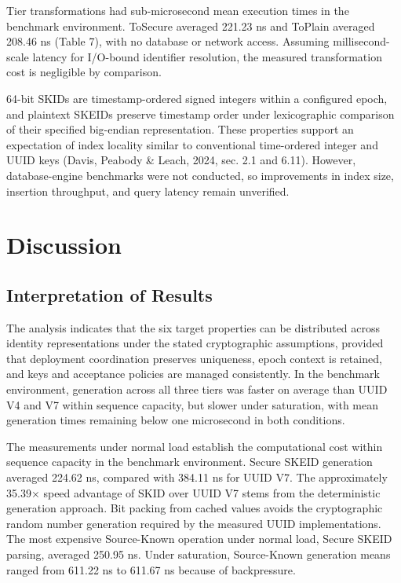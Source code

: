 \documentclass[fleqn,10pt,lineno]{wlpeerj}
\begin{document}
Tier transformations had sub-microsecond mean execution times in the
benchmark environment. ToSecure averaged 221.23 ns and ToPlain averaged
208.46 ns (Table 7), with no database or network access. Assuming
millisecond-scale latency for I/O-bound identifier resolution, the
measured transformation cost is negligible by comparison.

64-bit SKIDs are timestamp-ordered signed integers within a configured
epoch, and plaintext SKEIDs preserve timestamp order under lexicographic
comparison of their specified big-endian representation. These
properties support an expectation of index locality similar to
conventional time-ordered integer and UUID keys (Davis, Peabody \&
Leach, 2024, sec. 2.1 and 6.11). However, database-engine benchmarks
were not conducted, so improvements in index size, insertion throughput,
and query latency remain unverified.

\section{Discussion}\label{discussion}

\subsection{Interpretation of Results}\label{interpretation-of-results}

The analysis indicates that the six target properties can be distributed
across identity representations under the stated cryptographic
assumptions, provided that deployment coordination preserves uniqueness,
epoch context is retained, and keys and acceptance policies are managed
consistently. In the benchmark environment, generation across all three
tiers was faster on average than UUID V4 and V7 within sequence
capacity, but slower under saturation, with mean generation times
remaining below one microsecond in both conditions.

The measurements under normal load establish the computational cost
within sequence capacity in the benchmark environment. Secure SKEID
generation averaged 224.62 ns, compared with 384.11 ns for UUID V7. The
approximately 35.39× speed advantage of SKID over UUID V7 stems from the
deterministic generation approach. Bit packing from cached values avoids
the cryptographic random number generation required by the measured UUID
implementations. The most expensive Source-Known operation under normal
load, Secure SKEID parsing, averaged 250.95 ns. Under saturation,
Source-Known generation means ranged from 611.22 ns to 611.67 ns because
of backpressure.
\end{document}
